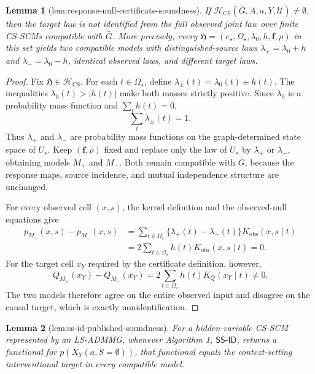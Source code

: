 \documentclass{article}
\newtheorem{lemma}{Lemma}
\begin{document}
\begin{lemma}[lem:response-null-certificate-soundness]\label{lem:response-null-certificate-soundness}
If \(\mathcal H_{\mathrm{CS}}(\bar G,A,a,Y,\mathcal U)\ne\emptyset\), then the target law is not identified from the full observed joint law over finite CS-SCMs compatible with \(\bar G\). More precisely, every \(\mathfrak H=(e_\star,\Omega_\star,\lambda_0,h,\mathbf f,\rho)\) in this set yields two compatible models with distinguished-source laws \(\lambda_+=\lambda_0+h\) and \(\lambda_-=\lambda_0-h\), identical observed laws, and different target laws.
\end{lemma}
\begin{proof}
Fix \(\mathfrak H\in\mathcal H_{\mathrm{CS}}\). For each \(t\in\Omega_\star\), define \(\lambda_\pm(t)=\lambda_0(t)\pm h(t)\). The inequalities \(\lambda_0(t)>|h(t)|\) make both masses strictly positive. Since \(\lambda_0\) is a probability mass function and \(\sum_t h(t)=0\),
\[
\sum_t\lambda_\pm(t)=1.
\]
Thus \(\lambda_+\) and \(\lambda_-\) are probability mass functions on the graph-determined state space of \(U_\star\). Keep \((\mathbf f,\rho)\) fixed and replace only the law of \(U_\star\) by \(\lambda_+\) or \(\lambda_-\), obtaining models \(M_+\) and \(M_-\). Both remain compatible with \(\bar G\), because the response maps, source incidence, and mutual independence structure are unchanged.

For every observed cell \((x,s)\), the kernel definition and the observed-null equations give
\[
\begin{aligned}
p_{M_+}(x,s)-p_{M_-}(x,s)
&=\sum_{t\in\Omega_\star}\{\lambda_+(t)-\lambda_-(t)\}K_{\mathrm{obs}}(x,s\mid t)\\
&=2\sum_{t\in\Omega_\star}h(t)K_{\mathrm{obs}}(x,s\mid t)=0.
\end{aligned}
\]
For the target cell \(x_Y\) required by the certificate definition, however,
\[
Q_{M_+}(x_Y)-Q_{M_-}(x_Y)=2\sum_{t\in\Omega_\star}h(t)K_Q(x_Y\mid t)\ne0.
\]
The two models therefore agree on the entire observed input and disagree on the causal target, which is exactly nonidentification.
\end{proof}

\begin{lemma}[lem:ss-id-published-soundness]\label{lem:ss-id-published-soundness}
For a hidden-variable CS-SCM represented by an LS-ADMMG, whenever Algorithm 1, \(\mathsf{SS\text{-}ID}\), returns a functional for \(p(X_Y(a,S=\emptyset))\), that functional equals the context-setting interventional target in every compatible model.
\end{lemma}
\end{document}
